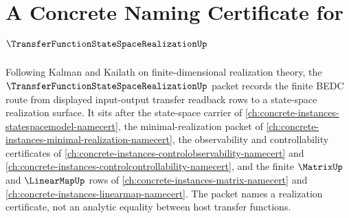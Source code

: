 \chapter{A Concrete Naming Certificate for $\TransferFunctionStateSpaceRealizationUp$}
\label{ch:concrete-instances-transfer-function-state-space-realization-namecert}

Following Kalman and Kailath on finite-dimensional realization theory, the $\TransferFunctionStateSpaceRealizationUp$ packet records the finite BEDC route from displayed input-output transfer readback rows to a state-space realization surface. It sits after the state-space carrier of \autoref{ch:concrete-instances-statespacemodel-namecert}, the minimal-realization packet of \autoref{ch:concrete-instances-minimal-realization-namecert}, the observability and controllability certificates of \autoref{ch:concrete-instances-controlobservability-namecert} and \autoref{ch:concrete-instances-controlcontrollability-namecert}, and the finite $\MatrixUp$ and $\LinearMapUp$ rows of \autoref{ch:concrete-instances-matrix-namecert} and \autoref{ch:concrete-instances-linearmap-namecert}. The packet names a realization certificate, not an analytic equality between host transfer functions.

